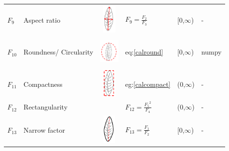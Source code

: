 \documentclass{article}
\begin{document}
\begin{longtable}{llllll}
$F_{9}$                     & Aspect ratio                                                                                &     \centering\includegraphics[width=10mm, height=15mm]{./Figures/AR.png}                       &       $F_9 = \frac{F_2}{F_3}$                      &       [0,$\infty$)                    &                                -                               \\
$F_{10}$                     & Roundness/ Circularity                                                                      &       \centering\includegraphics[width=10mm, height=15mm]{./Figures/roudness.png}                       &           eq:\ref{calround}                  &          [0,$\infty$)                &     numpy                                                          \\
$F_{11}$                     & Compactness                                                                                 &     \centering\includegraphics[width=10mm, height=15mm]{./Figures/rect.png}                       &        eg:\ref{calcompact}                     &     (0,$\infty$)                      &                   -                                            \\
$F_{12}$                     & Rectangularity                                                                              &                            &       $F_{12} = \frac{{F_5}^2}{F_4}$                      &      (0,$\infty$)                     &               -                                                \\
$F_{13}$                     & Narrow factor                                                                               &       \centering\includegraphics[width=10mm, height=15mm]{./Figures/nf.png}                     &         $F_{13} = \frac{F_1}{F_2}$                    &     [0,$\infty$)                      &                     -                                          \\

\end{longtable}
\end{document}
